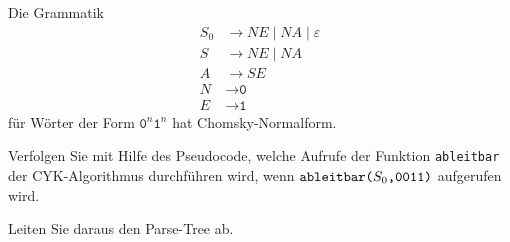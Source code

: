 \def\w#1{\texttt{#1}}
\def\a#1#2#3{
	\texttt{\phantom{#3}ableitbar(}#1\w{,}#2\w{)}
}
Die Grammatik
\begin{align*}
S_0& \to NE \mid NA \mid \varepsilon \\
S  & \to NE \mid NA \\
A  &\to SE \\
N&\to \w{0} \\
E&\to \w{1} 
\end{align*}
für Wörter der Form
$\w{0}^n\w{1}^n$
hat Chomsky-Normalform.
\begin{teilaufgaben}
\item
Verfolgen Sie mit Hilfe des Pseudocode, welche Aufrufe der Funktion
\w{ableitbar} der CYK-Algorithmus durchführen wird, wenn 
$\a{S_0}{\w{0011}}{}$ aufgerufen wird.
\item 
Leiten Sie daraus den Parse-Tree ab.
\end{teilaufgaben}


